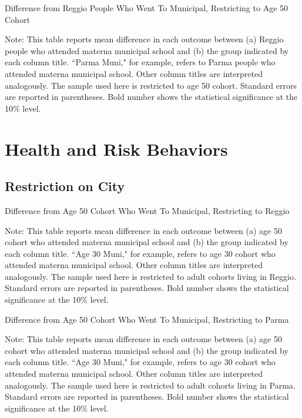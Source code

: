 \documentclass[11pt]{article}
\begin{document}
\begin{table}[H]
\begin{center}
	\caption{Difference from Reggio People Who Went To Municipal, Restricting to Age 50 Cohort}
	\scalebox{0.83}{
		}
\end{center}
\footnotesize
Note: This table reports mean difference in each outcome between (a) Reggio people who attended materna municipal school and (b) the group indicated by each column title. ``Parma Muni," for example, refers to Parma people who attended materna municipal school. Other column titles are interpreted analogously. The sample used here is restricted to age 50 cohort. Standard errors are reported in parentheses. Bold number shows the statistical significance at the 10\% level. 
\end{table}










\section{Health and Risk Behaviors}
\subsection{Restriction on City}
\begin{table}[H]
\begin{center}
	\caption{Difference from Age 50 Cohort Who Went To Municipal, Restricting to Reggio}
	\scalebox{0.83}{
		}
\end{center}
\footnotesize
Note: This table reports mean difference in each outcome between (a) age 50 cohort who attended materna municipal school and (b) the group indicated by each column title. ``Age 30 Muni," for example, refers to age 30 cohort who attended materna municipal school. Other column titles are interpreted analogously. The sample used here is restricted to adult cohorts living in Reggio. Standard errors are reported in parentheses. Bold number shows the statistical significance at the 10\% level. 
\end{table}

\begin{table}[H]
\begin{center}
	\caption{Difference from Age 50 Cohort Who Went To Municipal, Restricting to Parma}
	\scalebox{0.83}{
		}
\end{center}
\footnotesize
Note: This table reports mean difference in each outcome between (a) age 50 cohort who attended materna municipal school and (b) the group indicated by each column title. ``Age 30 Muni," for example, refers to age 30 cohort who attended materna municipal school. Other column titles are interpreted analogously. The sample used here is restricted to adult cohorts living in Parma. Standard errors are reported in parentheses. Bold number shows the statistical significance at the 10\% level. 
\end{table}
\end{document}
